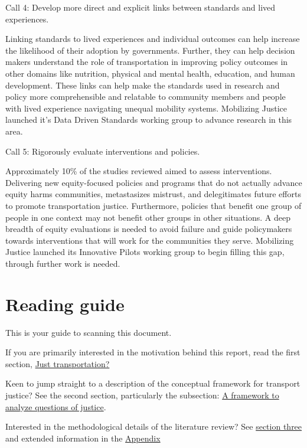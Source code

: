 \documentclass[12pt, oneside]{report}
\begin{document}
Call 4: Develop more direct and explicit links between standards and
lived experiences.

Linking standards to lived experiences and individual outcomes can help
increase the likelihood of their adoption by governments. Further, they
can help decision makers understand the role of transportation in
improving policy outcomes in other domains like nutrition, physical and
mental health, education, and human development. These links can help
make the standards used in research and policy more comprehensible and
relatable to community members and people with lived experience
navigating unequal mobility systems. Mobilizing Justice launched it's
Data Driven Standards working group to advance research in this area.

Call 5: Rigorously evaluate interventions and policies.

Approximately 10\% of the studies reviewed aimed to assess
interventions. Delivering new equity-focused policies and programs that
do not actually advance equity harms communities, metastasizes mistrust,
and delegitimates future efforts to promote transportation justice.
Furthermore, policies that benefit one group of people in one context
may not benefit other groups in other situations. A deep breadth of
equity evaluations is needed to avoid failure and guide policymakers
towards interventions that will work for the communities they serve.
Mobilizing Justice launched its Innovative Pilots working group to begin
filling this gap, through further work is needed.

\newpage

\hypertarget{reading-guide}{%
\section{Reading guide}\label{reading-guide}}

This is your guide to scanning this document.

If you are primarily interested in the motivation behind this report,
read the first section, \protect\hyperlink{sect1}{Just transportation?}

Keen to jump straight to a description of the conceptual framework for
transport justice? See the second section, particularly the subsection:
\protect\hyperlink{sect2.2}{A framework to analyze questions of
justice}.

Interested in the methodological details of the literature review? See
\protect\hyperlink{sect3}{section three} and extended information in the
\protect\hyperlink{sect8}{Appendix}
\end{document}
